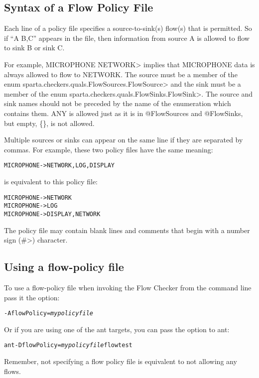 \subsection{Syntax of a Flow Policy File}

Each line of a policy file specifies a source-to-sink(s) flow(s) that is permitted. So if 
``A \flowsto{} B,C'' appears in the file, then information from source A is allowed to flow
to sink B or sink C.  

For example,
\<MICROPHONE \flowsto{} NETWORK> implies that
MICROPHONE data is always allowed to flow to NETWORK.  
The source must be a member of the enum
\<sparta.checkers.quals.FlowSources.FlowSource> and the sink must be a
member of the enum 
\<sparta.checkers.quals.FlowSinks.FlowSink>.  The source 
and sink names should not be preceded by the name of the enumeration which contains them.
ANY is allowed just as it is in @FlowSources and @FlowSinks, but empty, \{\}, is not allowed.

Multiple sources or sinks can appear on the same line if they are separated by commas. 
For example,
these two policy files have the same meaning:

\begin{alltt}
   MICROPHONE -> NETWORK, LOG, DISPLAY
\end{alltt}
is equivalent to this policy file:
\begin{alltt}
   MICROPHONE -> NETWORK
   MICROPHONE -> LOG
   MICROPHONE -> DISPLAY, NETWORK
\end{alltt}

The policy file may contain blank lines and comments that begin with 
a number sign (\<\#>) character.



\subsection{Using a flow-policy file}
To use a flow-policy file when invoking the Flow Checker from the
command line pass it the option:
\begin{alltt}
-AflowPolicy=\emph{mypolicyfile}
\end{alltt}

Or if you are using one of the ant targets, you can pass the option to ant:
\begin{alltt}
ant -DflowPolicy=\emph{mypolicyfile} flowtest
\end{alltt}

Remember, not specifying a flow policy file is equivalent to not
allowing any flows.



